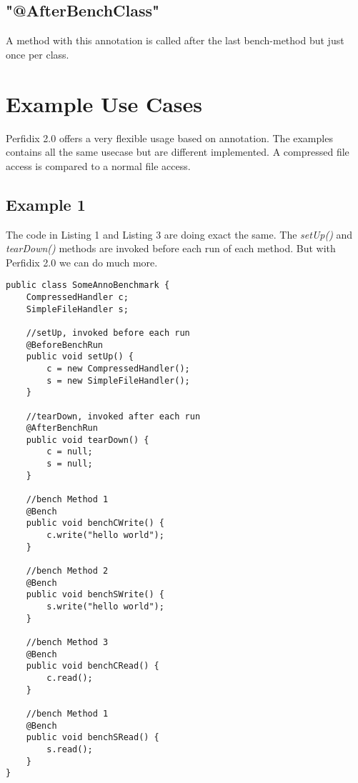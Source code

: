 \documentclass[12pt]{article}
\begin{document}
\subsection{"@AfterBenchClass"}
A method with this annotation is called after the last bench-method but just once per class.

\newpage
\section{Example Use Cases}
Perfidix 2.0 offers a very flexible usage based on annotation. The examples contains all the same usecase but are different implemented. A compressed file access is compared to a normal file access.
\subsection{Example 1}
The code in Listing 1 and Listing 3 are doing exact the same. The \emph{setUp()} and \emph{tearDown()} methods are invoked before each run of each method. But with Perfidix 2.0 we can do much more.
\begin{lstlisting}[caption=Perfidix 2.0]
public class SomeAnnoBenchmark {
	CompressedHandler c;
	SimpleFileHandler s;

	//setUp, invoked before each run
	@BeforeBenchRun
	public void setUp() {
		c = new CompressedHandler();
		s = new SimpleFileHandler();
	}

	//tearDown, invoked after each run
	@AfterBenchRun
	public void tearDown() {
		c = null;
		s = null;
	}

	//bench Method 1
	@Bench
	public void benchCWrite() {
		c.write("hello world");
	}

	//bench Method 2
	@Bench
	public void benchSWrite() {
		s.write("hello world");
	}

	//bench Method 3
	@Bench
	public void benchCRead() {
		c.read();
	}

	//bench Method 1
	@Bench
	public void benchSRead() {
		s.read();
	}
}
\end{lstlisting}
\end{document}
